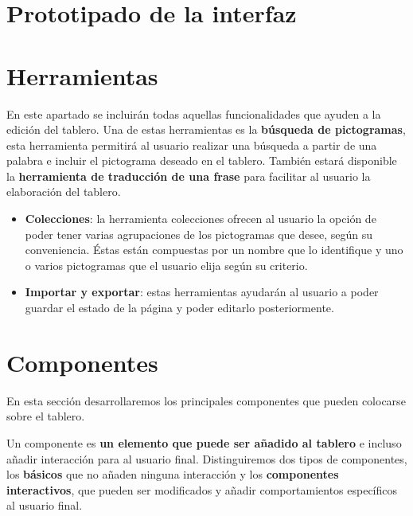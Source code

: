 \section{Prototipado de la interfaz}

\section{Herramientas}

En este apartado se incluirán todas aquellas funcionalidades que ayuden a la edición del tablero. Una de estas herramientas es la \textbf{búsqueda de pictogramas}, esta herramienta permitirá al usuario realizar una búsqueda a partir de una palabra e incluir el pictograma deseado en el tablero. También estará disponible la \textbf{herramienta de traducción de una frase} para facilitar al usuario la elaboración del tablero.

\begin{itemize}
	\item \textbf{Colecciones}: la herramienta colecciones ofrecen al usuario la opción de poder tener varias agrupaciones de los pictogramas que desee, según su conveniencia. Éstas están compuestas por un nombre que lo identifique y uno o varios pictogramas que el usuario elija según su criterio.
	
	\item \textbf{Importar y exportar}: estas herramientas ayudarán al usuario a poder guardar el estado de la página y poder editarlo posteriormente. 
\end{itemize}


\section{Componentes}


En esta sección desarrollaremos los principales componentes que pueden colocarse sobre el tablero. 

Un componente es \textbf{un elemento que puede ser añadido al tablero} e incluso añadir interacción para al usuario final. Distinguiremos dos tipos de componentes, los \textbf{básicos} que no añaden ninguna interacción y los \textbf{componentes interactivos}, que pueden ser modificados y añadir comportamientos específicos al usuario final.

